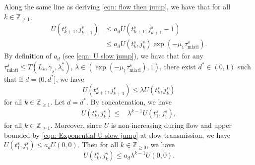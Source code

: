 Along the same line as deriving \eqref{eqn: flow then jump}, we have that for all $ k \in \mathbb{Z}_{\geq 1}$,
\begin{equation*}
    \begin{aligned}
        U(t^s_{k+1}, j^s_{k+1}) &\leq a_d U(t^s_{k+1},j^s_{k+1} - 1)
        \\
        &\leq a_d U(t_k^s, j_k^s) \exp (-\mu_1\tau_{\text{miati}}^s ).
    \end{aligned} 
\end{equation*}
By definition of $a_d$ (see \eqref{eqn: U slow jump}), we have that for any $\tau_{\text{miati}}^{s} \leq T(L_s, \gamma_s, \lambda_s^*)$, $\lambda \in (\exp (-\mu_1\tau_{\text{miati}}^s ), 1)$, there exist $d^* \in (0,1)$ such that if $d = (0, d^*]$, we have
\begin{equation*}
    U(t^s_{k+1}, j^s_{k+1}) \leq \lambda U(t^s_k,j^s_k)
\end{equation*}
for all $k \in \mathbb{Z}_{\geq 1}$. Let $d = d^*$.
By concatenation, we have
\begin{equation*}
    \begin{aligned}
        U(t^s_k, j^s_k) \leq & \lambda^{k-1}U(t_1^s, j_1^s),
    \end{aligned}
\end{equation*}
for all $k \in \mathbb{Z}_{\geq 1}$. 
%
Moreover, since $U$ is non-increasing during flow and upper bounded by \eqref{eqn: Exponential U slow jump} at slow transmission, we have $ U(t_1^s,j_1^s) \leq  a_d U(0,0) $. Then for all $k \in \mathbb{Z}_{\geq 0}$, we have
\begin{equation}
    U(t_k^s, j_k^s) \leq a_d \lambda^{k-1} U(0,0). \label{eqn: Exponential U slow jump decay}
\end{equation}

